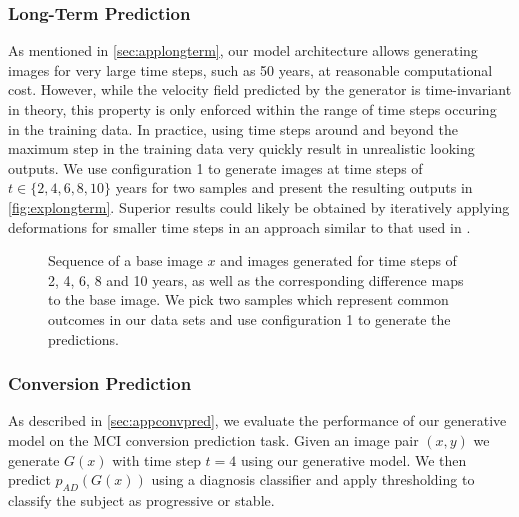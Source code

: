 
\subsubsection*{Long-Term Prediction}
\label{sec:explongterm}
As mentioned in \autoref{sec:applongterm}, our model architecture allows generating images for very large time steps, such as 50 years, at reasonable computational cost. However, while the velocity field predicted by the generator is time-invariant in theory, this property is only enforced within the range of time steps occuring in the training data. In practice, using time steps around and beyond the maximum step in the training data very quickly result in unrealistic looking outputs. We use configuration 1 to generate images at time steps of $t \in \{2, 4, 6, 8, 10\}$ years for two samples and present the resulting outputs in \autoref{fig:explongterm}.
Superior results could likely be obtained by iteratively applying deformations for smaller time steps in an approach similar to that used in \cite{wegmayr2019generative}.

\begin{figure}[h]
	\centering
	
	\vspace{-15pt}
	\caption{Sequence of a base image $x$ and images generated for time steps of 2, 4, 6, 8 and 10 years, as well as the corresponding difference maps to the base image. We pick two samples which represent common outcomes in our data sets and use configuration 1 to generate the predictions.}
	\label{fig:explongterm}
\end{figure}

\subsubsection*{Conversion Prediction}
As described in \autoref{sec:appconvpred}, we evaluate the performance of our generative model on the MCI conversion prediction task. Given an image pair $(x, y)$ we generate $G(x)$ with time step $t = 4$ using our generative model. We then predict $p_{AD}(G(x))$ using a diagnosis classifier and apply thresholding to classify the subject as progressive or stable.


